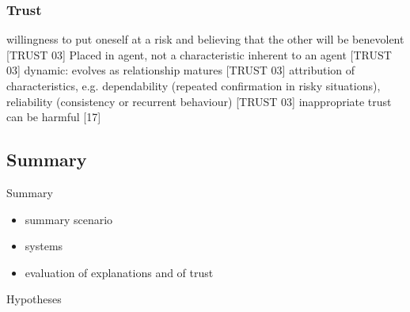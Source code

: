\subsubsection{Trust}
willingness to put oneself at a risk and believing that the other will be benevolent [TRUST 03]\newline
Placed in agent, not a characteristic inherent to an agent [TRUST 03]\newline
dynamic: evolves as relationship matures [TRUST 03]\newline
attribution of characteristics, e.g. dependability (repeated confirmation in risky situations), reliability (consistency or recurrent behaviour) [TRUST 03]\newline
inappropriate trust can be harmful [17]\newline



\subsection{Summary}
Summary\newline
\begin{itemize}
	\item summary scenario
	\item systems
	\item evaluation of explanations and of trust
\end{itemize}
Hypotheses
